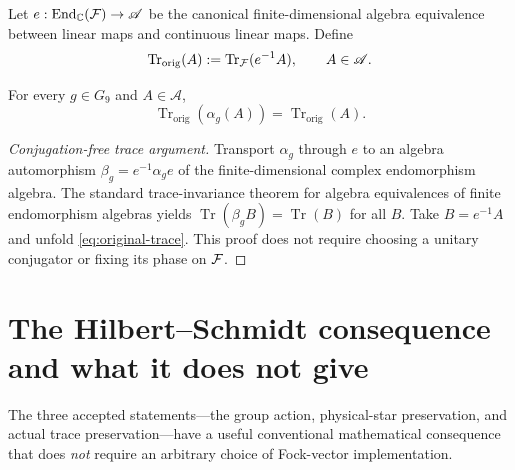 \begin{definition}
Let $e:\operatorname{End}_{\mathbb C}(\mathcal F)\to\mathscr A$
be the canonical finite-dimensional algebra equivalence between
linear maps and continuous linear maps. Define
\begin{equation}\label{eq:original-trace}
 \operatorname{Tr}_{\mathrm{orig}}(A)
  := \operatorname{Tr}_{\mathcal F}(e^{-1}A),
  \qquad A\in\mathscr A.
\end{equation}
\end{definition}

\begin{theorem}
\label{thm:original-fock-trace}
For every $g\in G_9$ and $A\in\mathscr A$,
\begin{equation}\label{eq:trace-invariant}
 \operatorname{Tr}_{\mathrm{orig}}(\alpha_g(A))
   =\operatorname{Tr}_{\mathrm{orig}}(A).
\end{equation}
\end{theorem}
\begin{proof}[Conjugation-free trace argument]
Transport $\alpha_g$ through $e$ to an algebra automorphism
$\beta_g=e^{-1}\alpha_g e$ of the finite-dimensional complex
endomorphism algebra. The standard trace-invariance theorem for algebra
equivalences of finite endomorphism algebras yields
$\operatorname{Tr}(\beta_g B)=\operatorname{Tr}(B)$ for all $B$.
Take $B=e^{-1}A$ and unfold \eqref{eq:original-trace}.
This proof does not require choosing a unitary conjugator or fixing
its phase on $\mathcal F$.
\end{proof}

\section{The Hilbert--Schmidt consequence and what it does not give}
The three accepted statements---the group action, physical-star
preservation, and actual trace preservation---have a useful conventional
mathematical consequence that does \emph{not} require an arbitrary choice
of Fock-vector implementation.

